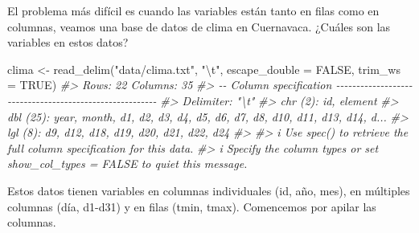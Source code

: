 \documentclass[
]{book}
\newenvironment{Shaded}{\begin{snugshade}}{\end{snugshade}}
\newcommand{\AttributeTok}[1]{\textcolor[rgb]{0.77,0.63,0.00}{#1}}
\newcommand{\CommentTok}[1]{\textcolor[rgb]{0.56,0.35,0.01}{\textit{#1}}}
\newcommand{\ConstantTok}[1]{\textcolor[rgb]{0.00,0.00,0.00}{#1}}
\newcommand{\FunctionTok}[1]{\textcolor[rgb]{0.00,0.00,0.00}{#1}}
\newcommand{\NormalTok}[1]{#1}
\newcommand{\OtherTok}[1]{\textcolor[rgb]{0.56,0.35,0.01}{#1}}
\newcommand{\SpecialCharTok}[1]{\textcolor[rgb]{0.00,0.00,0.00}{#1}}
\newcommand{\StringTok}[1]{\textcolor[rgb]{0.31,0.60,0.02}{#1}}
\begin{document}
El problema más difícil es cuando las variables están tanto en filas como en
columnas, veamos una base de datos de clima en Cuernavaca. ¿Cuáles son las
variables en estos datos?

\begin{Shaded}
\begin{Highlighting}[]
\NormalTok{clima }\OtherTok{\textless{}{-}} \FunctionTok{read\_delim}\NormalTok{(}\StringTok{"data/clima.txt"}\NormalTok{, }\StringTok{"}\SpecialCharTok{\textbackslash{}t}\StringTok{"}\NormalTok{, }\AttributeTok{escape\_double =} \ConstantTok{FALSE}\NormalTok{, }
    \AttributeTok{trim\_ws =} \ConstantTok{TRUE}\NormalTok{)}
\CommentTok{\#\textgreater{} Rows: 22 Columns: 35}
\CommentTok{\#\textgreater{} {-}{-} Column specification {-}{-}{-}{-}{-}{-}{-}{-}{-}{-}{-}{-}{-}{-}{-}{-}{-}{-}{-}{-}{-}{-}{-}{-}{-}{-}{-}{-}{-}{-}{-}{-}{-}{-}{-}{-}{-}{-}{-}{-}{-}{-}{-}{-}{-}{-}{-}{-}{-}{-}{-}{-}{-}{-}{-}{-}}
\CommentTok{\#\textgreater{} Delimiter: "\textbackslash{}t"}
\CommentTok{\#\textgreater{} chr  (2): id, element}
\CommentTok{\#\textgreater{} dbl (25): year, month, d1, d2, d3, d4, d5, d6, d7, d8, d10, d11, d13, d14, d...}
\CommentTok{\#\textgreater{} lgl  (8): d9, d12, d18, d19, d20, d21, d22, d24}
\CommentTok{\#\textgreater{} }
\CommentTok{\#\textgreater{} i Use \textasciigrave{}spec()\textasciigrave{} to retrieve the full column specification for this data.}
\CommentTok{\#\textgreater{} i Specify the column types or set \textasciigrave{}show\_col\_types = FALSE\textasciigrave{} to quiet this message.}
\end{Highlighting}
\end{Shaded}

Estos datos tienen variables en columnas individuales (id, año, mes), en
múltiples columnas (día, d1-d31) y en filas (tmin, tmax). Comencemos por apilar
las columnas.
\end{document}
